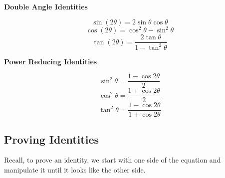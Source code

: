 \documentclass{exam}
\begin{document}
\begin{tcolorbox}[title=Recall: \textit{Fundamental Trigonometric Identities},title filled,colframe=black,sharpish corners,width=\linewidth]
    \vspace{.2in}

    \begin{minipage}[t]{.45\linewidth}
        \begin{center}
            \textbf{Double Angle Identities}
        \end{center}
        \[\sin(2\theta)=2\sin\theta\cos\theta\]
        \[\cos(2\theta)=\cos^2\theta-\sin^2\theta\]
        \[\tan(2\theta)=\frac{2\tan\theta}{1-\tan^2\theta}\]
    \end{minipage}
    \hfil
    \begin{minipage}[t]{.45\linewidth}
        \begin{center}
            \textbf{Power Reducing Identities}
        \end{center}
        \[\sin^2\theta=\frac{1-\cos2\theta}{2}\]
        \[\cos^2\theta=\frac{1+\cos2\theta}{2}\]
        \[\tan^2\theta=\frac{1-\cos2\theta}{1+\cos2\theta}\]
    \end{minipage}



\end{tcolorbox}

\subsection*{Proving Identities}
Recall, to prove an identity, we start with one side of the equation and manipulate it until it looks like the other side. 
\end{document}
